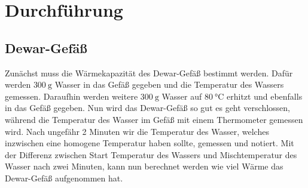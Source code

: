 \section{Durchführung}
\label{sec:Durchführung}

\subsection{Dewar-Gefäß}
Zunächst muss die Wärmekapazität des Dewar-Gefäß bestimmt werden.
Dafür werden $\SI{300}{\gram}$ Wasser in das Gefäß gegeben und die Temperatur des Wassers gemessen.
Daraufhin werden weitere $\SI{300}{\gram}$ Wasser auf $\SI{80}{\celsius}$ erhitzt und ebenfalls in das Gefäß gegeben.
Nun wird das Dewar-Gefäß so gut es geht verschlossen, während die Temperatur des Wasser im Gefäß mit einem Thermometer gemessen wird.
Nach ungefähr 2 Minuten wir die Temperatur des Wasser, welches inzwischen eine homogene Temperatur haben sollte, gemessen und notiert.
Mit der Differenz zwischen Start Temperatur des Wassers und Mischtemperatur des Wasser nach zwei Minuten, kann nun berechnet werden wie viel Wärme das Dewar-Gefäß aufgenommen hat.

